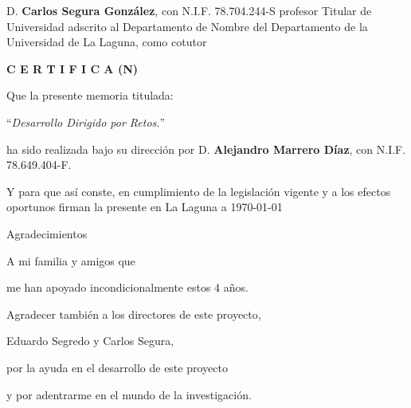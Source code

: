 \documentclass[spanish,a4paper,14pt,oneside]{extreport}
\begin{document}
\bigskip
D. {\bf Carlos Segura González}, con N.I.F. 78.704.244-S
profesor
Titular de Universidad
adscrito al Departamento
de Nombre del Departamento
de la Universidad de La Laguna, como cotutor

\bigskip
\bigskip
{\bf C E R T I F I C A (N)}

\bigskip
\bigskip
\bigskip
Que la presente memoria titulada:

\bigskip
``{\it Desarrollo Dirigido por Retos.}''

\bigskip
\bigskip
\bigskip

\noindent ha sido realizada bajo su dirección por D. {\bf Alejandro Marrero Díaz},
con N.I.F. 78.649.404-F.

\bigskip
\bigskip

Y para que así conste, en cumplimiento de la legislación vigente y a los efectos
oportunos firman la presente en La Laguna a \today

\newpage
\thispagestyle{empty}

{ \flushright

\begin{LARGE}
Agradecimientos
\end{LARGE}

\hspace{3mm}

\begin{large}


\hspace{3mm}
A mi familia y amigos que

\hspace{3mm}
me han apoyado incondicionalmente estos 4 años.

\bigskip

\hspace{3mm}
Agradecer también a los directores de este proyecto,

\hspace{3mm}
Eduardo Segredo y Carlos Segura,

\hspace{3mm}
por la ayuda en el desarrollo de este proyecto

\hspace{3mm}
y por adentrarme en el mundo de la investigación.

\end{large}

}

\newpage
\end{document}
